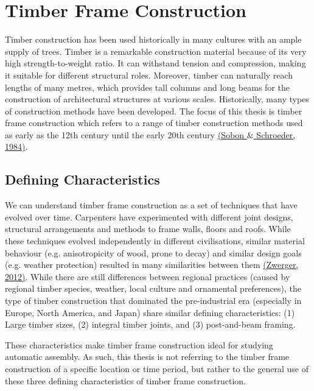 \documentclass[11pt]{book}
\begin{document}
\section{Timber Frame Construction}

Timber construction has been used historically in many cultures with an ample supply of trees. Timber is a remarkable construction material because of its very high strength-to-weight ratio. It can withstand tension and compression, making it suitable for different structural roles. Moreover, timber can naturally reach lengths of many metres, which provides tall columns and long beams for the construction of architectural structures at various scales. Historically, many types of construction methods have been developed. The focus of this thesis is timber frame construction which refers to a range of timber construction methods used as early as the 12th century until the early 20th century \href{https://www.zotero.org/google-docs/?j9TO86}{(Sobon $\&$ Schroeder, 1984)}.

\subsection{Defining Characteristics}

We can understand timber frame construction as a set of techniques that have evolved over time. Carpenters have experimented with different joint designs, structural arrangements and methods to frame walls, floors and roofs. While these techniques evolved independently in different civilisations, similar material behaviour (e.g. anisotropicity of wood, prone to decay) and similar design goals (e.g. weather protection) resulted in many similarities between them \href{https://www.zotero.org/google-docs/?RgN7ZN}{(Zwerger, 2012)}. While there are still differences between regional practices (caused by regional timber species, weather, local culture and ornamental preferences), the type of timber construction that dominated the pre-industrial era (especially in Europe, North America, and Japan) share similar defining characteristics: (1) Large timber sizes, (2) integral timber joints, and (3) post-and-beam framing. 

These characteristics make timber frame construction ideal for studying automatic assembly. As such, this thesis is not referring to the timber frame construction of a specific location or time period, but rather to the general use of these three defining characteristics of timber frame construction.
\end{document}
